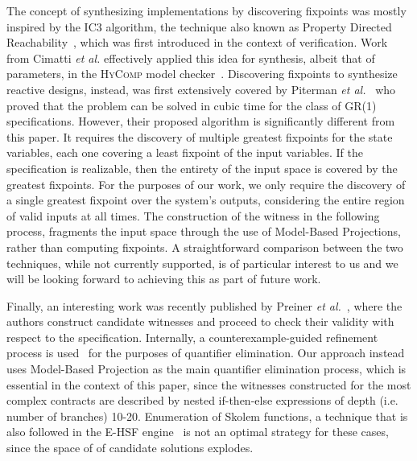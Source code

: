 The concept of synthesizing implementations by discovering fixpoints was mostly
inspired by the IC3 algorithm, the technique also known as Property Directed
Reachability~\cite{bradley2011sat,een2011efficient}, which was first introduced
in the context of verification. Work from Cimatti \textit{et al.} effectively
applied this idea for synthesis, albeit that of parameters, in the
\textsc{HyComp} model checker~\cite{DBLP:conf/fmcad/CimattiGMT13, cimatti2015hycomp}.
Discovering fixpoints to synthesize reactive designs, instead, was first
extensively covered by Piterman \textit{et al.}~\cite{piterman2006synthesis}
who proved that the problem can be solved in cubic time for the class of GR(1) specifications.
However, their proposed algorithm is significantly different from this paper. It
requires the discovery of multiple greatest fixpoints for the state variables,
each one covering a least fixpoint of the input variables. If the specification
is realizable, then the entirety of the input space is covered by the greatest fixpoints. For the purposes of our work, we only require the discovery of a single greatest fixpoint over the system's outputs, considering
the entire region of valid inputs at all times. The construction of the witness
in the following process, fragments the input space through the use of Model-Based Projections, rather than computing fixpoints.
A straightforward comparison between the two techniques, while not currently
supported, is of particular interest to us and we will be looking forward to
achieving this as part of future work.

Finally, an interesting work was recently published by Preiner \textit{et
al.}~\cite{preiner2017counterexample}, where the authors construct candidate
witnesses and proceed to check their validity with respect to the specification.
Internally, a counterexample-guided refinement process is
used~\cite{reynolds2015counterexample} for the purposes of quantifier
elimination. 
Our approach instead uses Model-Based Projection as the main
quantifier elimination process, which is essential in the context of this paper,
since the witnesses constructed for the most complex contracts are described by
nested if-then-else expressions of depth (i.e. number of branches) 10-20.
Enumeration of Skolem functions, a technique that is also followed in the E-HSF
engine~\cite{beyene2014constraint} is not an optimal strategy for these cases,
since the space of of candidate solutions explodes.

